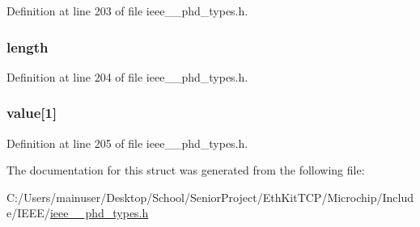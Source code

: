 Definition at line 203 of file ieee\+\_\+\_\+phd\+\_\+types.\+h.

\hypertarget{struct___nu_obs_value_cmp_a3743679e4ff85e3e1b3fc2e59973fbb3}{}
\subsubsection[{length}]{ length}\label{struct___nu_obs_value_cmp_a3743679e4ff85e3e1b3fc2e59973fbb3}


Definition at line 204 of file ieee\+\_\+\_\+phd\+\_\+types.\+h.

\hypertarget{struct___nu_obs_value_cmp_af92a9ff5f6c619206de03f520ebb5bd0}{}
\subsubsection[{value}]{ value\mbox{[}1\mbox{]}}\label{struct___nu_obs_value_cmp_af92a9ff5f6c619206de03f520ebb5bd0}


Definition at line 205 of file ieee\+\_\+\_\+phd\+\_\+types.\+h.



The documentation for this struct was generated from the following file\+:\begin{DoxyCompactItemize}
\item 
C\+:/\+Users/mainuser/\+Desktop/\+School/\+Senior\+Project/\+Eth\+Kit\+T\+C\+P/\+Microchip/\+Include/\+I\+E\+E\+E/\hyperlink{ieee__11073__phd__types_8h}{ieee\+\_\+\_\+phd\+\_\+types.\+h}\end{DoxyCompactItemize}
